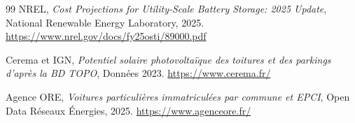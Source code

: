 \documentclass[12pt, a4paper]{report}
\begin{document}
\begin{thebibliography}{99}
NREL, \textit{Cost Projections for Utility-Scale Battery Storage: 2025 Update}, National Renewable Energy Laboratory, 2025. \url{https://www.nrel.gov/docs/fy25osti/89000.pdf}

Cerema et IGN, \textit{Potentiel solaire photovoltaïque des toitures et des parkings d'après la BD TOPO}, Données 2023. \url{https://www.cerema.fr/}

Agence ORE, \textit{Voitures particulières immatriculées par commune et EPCI}, Open Data Réseaux Énergies, 2025. \url{https://www.agenceore.fr/}

\end{thebibliography}
\end{document}

